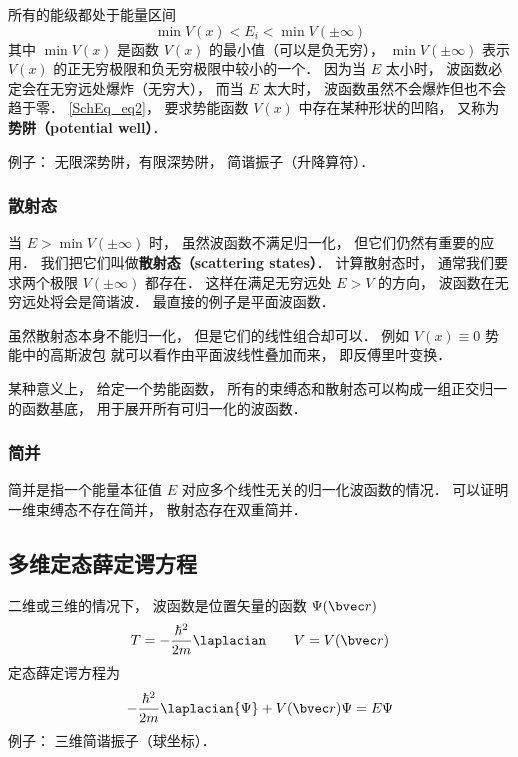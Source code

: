 所有的能级都处于能量区间
\begin{equation}\label{SchEq_eq2}
\min V(x) < E_i < \min V(\pm\infty)
\end{equation}
其中 $\min V(x)$ 是函数 $V(x)$ 的最小值（可以是负无穷）， $\min V(\pm\infty)$ 表示 $V(x)$ 的正无穷极限和负无穷极限中较小的一个． 因为当 $E$ 太小时， 波函数必定会在无穷远处爆炸（无穷大）， 而当 $E$ 太大时， 波函数虽然不会爆炸但也不会趋于零． \autoref{SchEq_eq2}， 要求势能函数 $V(x)$ 中存在某种形状的凹陷， 又称为\textbf{势阱（potential well）}．

例子： 无限深势阱，有限深势阱， 简谐振子（升降算符）．

\subsubsection{散射态}
当 $E > \min V(\pm\infty)$ 时， 虽然波函数不满足归一化， 但它们仍然有重要的应用． 我们把它们叫做\textbf{散射态（scattering states）}． 计算散射态时， 通常我们要求两个极限 $V(\pm \infty)$ 都存在． 这样在满足无穷远处 $E > V$ 的方向， 波函数在无穷远处将会是简谐波． 最直接的例子是平面波函数． %

虽然散射态本身不能归一化， 但是它们的线性组合却可以． 例如 $V(x) \equiv 0$ 势能中的高斯波包 就可以看作由平面波线性叠加而来， 即反傅里叶变换．

某种意义上， 给定一个势能函数， 所有的束缚态和散射态可以构成一组正交归一的函数基底， 用于展开所有可归一化的波函数．

\subsubsection{简并}
简并是指一个能量本征值 $E$ 对应多个线性无关的归一化波函数的情况． 可以证明一维束缚态不存在简并， 散射态存在双重简并．

\subsection{多维定态薛定谔方程}
二维或三维的情况下， 波函数是位置矢量的函数 $\Psi(\bvec r)$
\begin{equation}
T = -\frac{\hbar^2}{2m} \laplacian \qquad V = V(\bvec r)
\end{equation}
定态薛定谔方程为
\begin{equation}\label{SchEq_eq4}
-\frac{\hbar^2}{2m} \laplacian {\Psi} + V(\bvec r)\Psi = E \Psi
\end{equation}
例子： 三维简谐振子（球坐标）．

